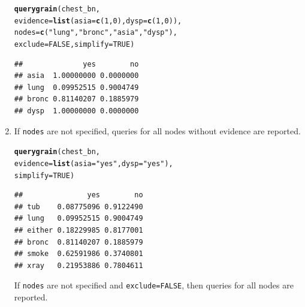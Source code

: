 \documentclass[10pt]{article}\usepackage[]{graphicx}\usepackage[]{xcolor}
\makeatletter
\newcommand{\hlnum}[1]{\textcolor[rgb]{0.686,0.059,0.569}{#1}}%
\newcommand{\hlstr}[1]{\textcolor[rgb]{0.192,0.494,0.8}{#1}}%
\newcommand{\hlstd}[1]{\textcolor[rgb]{0.345,0.345,0.345}{#1}}%
\newcommand{\hlkwc}[1]{\textcolor[rgb]{0.333,0.667,0.333}{#1}}%
\newcommand{\hlkwd}[1]{\textcolor[rgb]{0.737,0.353,0.396}{\textbf{#1}}}%
\newenvironment{kframe}{%
 \def\at@end@of@kframe{}%
 \ifinner\ifhmode%
  \def\at@end@of@kframe{\end{minipage}}%
  \begin{minipage}{\columnwidth}%
 \fi\fi%
 \def\FrameCommand##1{\hskip\@totalleftmargin \hskip-\fboxsep
 \colorbox{shadecolor}{##1}\hskip-\fboxsep
     \hskip-\linewidth \hskip-\@totalleftmargin \hskip\columnwidth}%
 \MakeFramed {\advance\hsize-\width
   \@totalleftmargin\z@ \linewidth\hsize
   \@setminipage}}%
 {\par\unskip\endMakeFramed%
 \at@end@of@kframe}
\newenvironment{knitrout}{}{} %
\def\code#1{{\texttt{#1}}}
\makeatother
\begin{document}
\begin{enumerate}
\begin{knitrout}
\color{fgcolor}\begin{kframe}
\begin{alltt}
\hlkwd{querygrain}\hlstd{(chest_bn,}
           \hlkwc{evidence}\hlstd{=}\hlkwd{list}\hlstd{(}\hlkwc{asia}\hlstd{=}\hlkwd{c}\hlstd{(}\hlnum{1}\hlstd{,} \hlnum{0}\hlstd{),} \hlkwc{dysp}\hlstd{=}\hlkwd{c}\hlstd{(}\hlnum{1}\hlstd{,} \hlnum{0}\hlstd{)),}
           \hlkwc{nodes}\hlstd{=}\hlkwd{c}\hlstd{(}\hlstr{"lung"}\hlstd{,} \hlstr{"bronc"}\hlstd{,} \hlstr{"asia"}\hlstd{,} \hlstr{"dysp"}\hlstd{),}
           \hlkwc{exclude}\hlstd{=}\hlnum{FALSE}\hlstd{,} \hlkwc{simplify} \hlstd{=} \hlnum{TRUE}\hlstd{)}
\end{alltt}
\begin{verbatim}
##              yes        no
## asia  1.00000000 0.0000000
## lung  0.09952515 0.9004749
## bronc 0.81140207 0.1885979
## dysp  1.00000000 0.0000000
\end{verbatim}
\end{kframe}
\end{knitrout}


\item If \code{nodes} are not specified, queries for all nodes without evidence are reported.
\begin{knitrout}
\color{fgcolor}\begin{kframe}
\begin{alltt}
\hlkwd{querygrain}\hlstd{(chest_bn,}
           \hlkwc{evidence}\hlstd{=}\hlkwd{list}\hlstd{(}\hlkwc{asia}\hlstd{=}\hlstr{"yes"}\hlstd{,} \hlkwc{dysp}\hlstd{=}\hlstr{"yes"}\hlstd{),}
           \hlkwc{simplify} \hlstd{=} \hlnum{TRUE}\hlstd{)}
\end{alltt}
\begin{verbatim}
##               yes        no
## tub    0.08775096 0.9122490
## lung   0.09952515 0.9004749
## either 0.18229985 0.8177001
## bronc  0.81140207 0.1885979
## smoke  0.62591986 0.3740801
## xray   0.21953886 0.7804611
\end{verbatim}
\end{kframe}
\end{knitrout}

If \code{nodes} are not specified and \code{exclude=FALSE}, then queries for all nodes are reported.


\end{enumerate}
\end{document}
